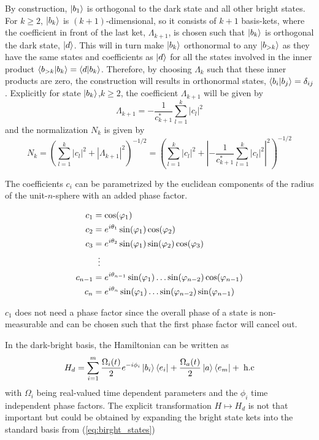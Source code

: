 By construction,  $\ket{b_1}$ is orthogonal to the dark state and all other bright states. For $k \geq 2$, $\ket{b_k}$ is $(k+1)$-dimensional, so it consists of $k+1$ basis-kets, where the coefficient in front of the last ket, $\Lambda_{k+1}$, is chosen such that $\ket{b_k}$ is orthogonal the dark state, $\ket{d}$. This will in turn make $\ket{b_k}$ orthonormal to any $\ket{b_{>k}}$ as they have the same states and coefficients as $\ket{d}$ for all the states involved in the inner product $\bra{b_{>k}}\ket{b_k} = \bra{d}\ket{b_k}$. Therefore, by choosing $\Lambda_k$ such that these inner products are zero, the construction will results in orthonormal states,  $\bra{b_i}\ket{b_j} = \delta_{ij}$. Explicitly for state $\ket{b_{k}}$,$k \geq 2$, the coefficient $\Lambda_{k+1}$ will be given by 
\begin{equation}
\Lambda_{k+1} = -\dfrac{1}{c_{k+1}^{*}}\sum_{l = 1}^{k}|c_l|^2
\end{equation}
and the normalization $N_{k}$ is given by 
\begin{equation}
N_k =  \left( \sum_{l = 1}^k|c_l|^2  + \left|\Lambda_{k+1}\right|^2 \right)^{-1/2} = \left( \sum_{l = 1}^k|c_l|^2  + \left|-\frac{1}{c_{k+1}^{*}}\sum_{l = 1}^{k} |c_l|^2 \right|^2 \right)^{-1/2}
\end{equation}


The coefficients $c_i$ can be parametrized by the euclidean components of the radius of the unit-$n$-sphere with an added phase factor.

\begin{equation}
\begin{aligned}
c_1 &= \cos(\varphi_1)
\\ 
c_2 &= e^{i\theta_1}\sin(\varphi_1)\cos(\varphi_2)
\\ 
c_3 &= e^{i\theta_2}\sin(\varphi_1)\sin(\varphi_2)\cos(\varphi_3)
\\
&\hspace{2mm}\vdots
\\
c_{n-1} &= e^{i\theta_{n-1}}\sin(\varphi_1)\dots\sin(\varphi_{n-2})\cos(\varphi_{n-1})
\\
c_{n} &= e^{i\theta_{n}}\sin(\varphi_1)\dots\sin(\varphi_{n-2})\sin(\varphi_{n-1})
\end{aligned}
\end{equation}

$c_1$ does not need a phase factor since the overall phase of a state is non-measurable and can be chosen such that the first phase factor will cancel out. 

In the dark-bright basis, the Hamiltonian can be written as
\begin{equation}
H_d = \sum_{i = 1}^m \frac{\Omega_i(t)}{2}e^{-i\phi_i}\ket{b_i}\bra{e_i} + \frac{\Omega_a(t)}{2}\ket{a}\bra{e_m} +\;\text{h.c}
\label{eq:HamdN}
\end{equation}
with $\Omega_i$ being real-valued time dependent parameters and the $\phi_i$ time independent phase factors. The explicit transformation $H \mapsto H_d$ is not that important but could be obtained by expanding the bright state kets into the standard basis from (\ref{eq:birght_states})

